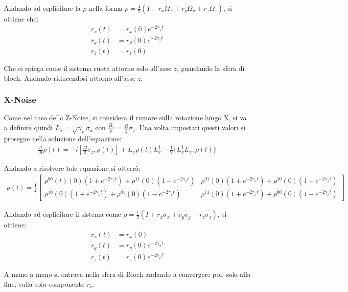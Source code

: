 Andando ad esplicitare la \(\rho\) nella forma \(\rho = \frac{1}{2}(I + r_x \Omega_x + r_y \Omega_y + r_z \Omega_z)\), si ottiene che:
\begin{align*}
    r_x(t) &= r_x(0)e^{-2 \gamma_z t}\\
    r_y(t) &= r_y(0)e^{-2 \gamma_z t}\\
    r_z(t) &= r_z(0)
\end{align*}

Che ci spiega come il sistema ruota attorno solo all'asse \(z\), guardando la sfera di bloch. Andando riducendosi attorno all'asse \(z\). 

\subsubsection{X-Noise}
Come nel caso dello Z-Noise, si considera il rumore sulla rotazione lungo X, si va a definire quindi \(L_x = \sqrt{\gamma_x}\sigma_x\) con \(\frac{H_s}{\hbar} = \frac{\Omega}{2}\sigma_z\). Una volta impostati questi valori si prosegue nella soluzione dell'equazione:
\begin{gather*}
\frac{d}{dt}\rho(t) = -i \left[\frac{\Omega}{2}\sigma_z,\rho(t)\right] + L_x \rho(t) L_x^\dagger - \frac{1}{2}\{L_x^\dagger L_x, \rho(t)\}
\end{gather*}

Andando a risolvere tale equazione si otterrà:
\begin{gather*}
    \rho(t) = 
    \frac{1}{2}
    \left[\begin{smallmatrix}
    \rho^{00}(t)(0)(1 + e^{-2 \gamma_x t}) + \rho^{11}(0)(1 - e^{-2 \gamma_x t}) & \rho^{01}(0)(1+e^{-2 \gamma_x t}) + \rho^{10}(0)(1 - e^{-2 \gamma_x t})\\
    \rho^{10}(0)(1+e^{-2 \gamma_x t}) + \rho^{01}(0) (1 - e^{-2 \gamma_x t}) & \rho^{11}(0)(1+e^{-2 \gamma_x t}) + \rho^{00}(0)(1 - e^{-2 \gamma_x t})
    \end{smallmatrix}\right]
\end{gather*}

Andando ad esplicitare il sistema come \(\rho = \frac{1}{2}(I + r_x \sigma_x + r_y \sigma_y + r_z \sigma_z)\), si ottiene:
\begin{align*}
r_x(t) &= r_x(0)\\
r_y(t) &= r_y(0)e^{-2 \gamma_x t}\\
r_z(t) &= r_z(0)e^{-2 \gamma_x t}
\end{align*}

A mano a mano si entrava nella sfera di Bloch andando a convergere poi, solo alla fine, sulla sola componente \(r_x\).

